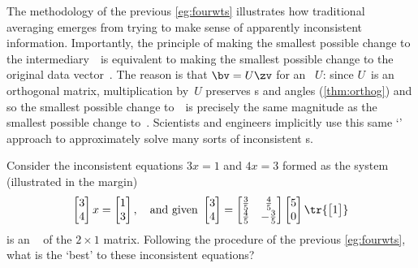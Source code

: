 The methodology of the previous \cref{eg:fourwts} illustrates how traditional averaging emerges from trying to make sense of apparently inconsistent information.
Importantly, the principle of making the smallest possible change to the intermediary~\zv\ is equivalent to making the smallest possible change to the original data vector~\bv.
The reason is that \(\bv=U\zv\) for an ~\(U\): since \(U\)~is an orthogonal matrix, multiplication by~\(U\) preserves s and angles (\cref{thm:orthog}) and so the smallest possible change to~\bv\ is precisely the same magnitude as the smallest possible change to~\zv.
Scientists and engineers implicitly use this same `' approach to approximately solve many sorts of inconsistent s.




\begin{activity}
Consider the inconsistent equations \(3x=1\) and \(4x=3\) formed as the system (illustrated in the margin)
%
\begin{equation*}
\begin{bmatrix} 3\\4 \end{bmatrix}x=\begin{bmatrix} 1\\3 \end{bmatrix},
\quad\text{and given }
\begin{bmatrix} 3\\4 \end{bmatrix}
=\begin{bmatrix} \frac35&\frac45\\\frac45&-\frac35 \end{bmatrix}
\begin{bmatrix} 5\\0 \end{bmatrix}
\tr{\begin{bmatrix} 1 \end{bmatrix}}
\end{equation*}
is an \svd\  of the \(2\times 1\) matrix.
Following the procedure of the previous \cref{eg:fourwts}, what is the `best'  to these inconsistent equations?
\end{activity}






